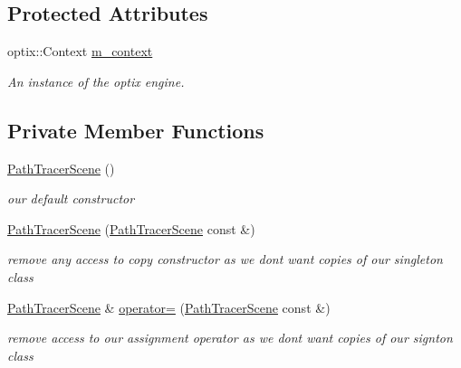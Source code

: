 \subsection*{Protected Attributes}
\begin{DoxyCompactItemize}
\item 
\hypertarget{class_path_tracer_scene_a0d27c55a17505f3cde35fe7ff89f3c3d}{optix\-::\-Context \hyperlink{class_path_tracer_scene_a0d27c55a17505f3cde35fe7ff89f3c3d}{m\-\_\-context}}\label{class_path_tracer_scene_a0d27c55a17505f3cde35fe7ff89f3c3d}

\begin{DoxyCompactList}\small\item\em An instance of the optix engine. \end{DoxyCompactList}\end{DoxyCompactItemize}
\subsection*{Private Member Functions}
\begin{DoxyCompactItemize}
\item 
\hyperlink{class_path_tracer_scene_adb714b43e1a14346af4cda2ffc34a9c7}{Path\-Tracer\-Scene} ()
\begin{DoxyCompactList}\small\item\em our default constructor \end{DoxyCompactList}\item 
\hypertarget{class_path_tracer_scene_ab9a8a66ab0736ee5244f10a979b3c9e1}{\hyperlink{class_path_tracer_scene_ab9a8a66ab0736ee5244f10a979b3c9e1}{Path\-Tracer\-Scene} (\hyperlink{class_path_tracer_scene}{Path\-Tracer\-Scene} const \&)}\label{class_path_tracer_scene_ab9a8a66ab0736ee5244f10a979b3c9e1}

\begin{DoxyCompactList}\small\item\em remove any access to copy constructor as we dont want copies of our singleton class \end{DoxyCompactList}\item 
\hypertarget{class_path_tracer_scene_a2bd36edf8e4842b4f56e050108483502}{\hyperlink{class_path_tracer_scene}{Path\-Tracer\-Scene} \& \hyperlink{class_path_tracer_scene_a2bd36edf8e4842b4f56e050108483502}{operator=} (\hyperlink{class_path_tracer_scene}{Path\-Tracer\-Scene} const \&)}\label{class_path_tracer_scene_a2bd36edf8e4842b4f56e050108483502}

\begin{DoxyCompactList}\small\item\em remove access to our assignment operator as we dont want copies of our signton class \end{DoxyCompactList}\end{DoxyCompactItemize}
